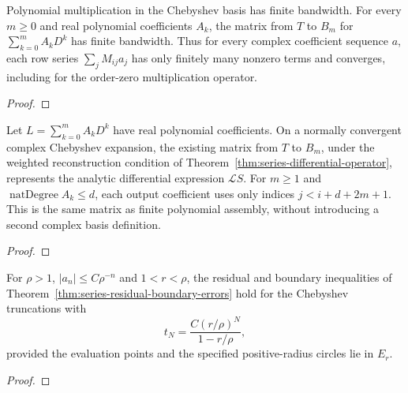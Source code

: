 \begin{supporting}
\begin{theorem}
\label{thm:ultraspherical-series-row-input}
\leanok
Polynomial multiplication in the Chebyshev basis has finite bandwidth.
For every $m\ge0$ and real polynomial coefficients $A_k$, the matrix from
$T$ to $B_m$ for $\sum_{k=0}^mA_kD^k$ has finite bandwidth. Thus for every complex coefficient sequence $a$, each row series $\sum_j M_{ij}a_j$ has only finitely many nonzero terms and converges,
including for the order-zero multiplication operator.
\end{theorem}
\begin{proof}
\leanok
\end{proof}
\end{supporting}


\begin{theorem}
\label{thm:analytic-ultraspherical-residual}
\leanok
Let $L=\sum_{k=0}^m A_kD^k$ have real polynomial coefficients.
On a normally convergent complex Chebyshev expansion, the existing matrix
from $T$ to $B_m$, under the weighted reconstruction condition of Theorem~\ref{thm:series-differential-operator},
represents the analytic differential expression $\mathcal LS$.
For $m\ge1$ and $\operatorname{natDegree} A_k\le d$, each output coefficient
uses only indices $j<i+d+2m+1$. This is the same matrix as finite polynomial
assembly, without introducing a second complex basis definition.
\end{theorem}
\begin{proof}
\leanok
\end{proof}

\begin{theorem}
\label{thm:chebyshev-series-residual-boundary-errors}
\leanok
For $\rho>1$, $|a_n|\le C\rho^{-n}$ and $1<r<\rho$, the residual and boundary inequalities of Theorem~\ref{thm:series-residual-boundary-errors} hold for the Chebyshev truncations with
\[
 t_N=\frac{C(r/\rho)^N}{1-r/\rho},
\]
provided the evaluation points and the specified positive-radius circles lie
in $E_r$.
\end{theorem}
\begin{proof}
\leanok
\end{proof}

